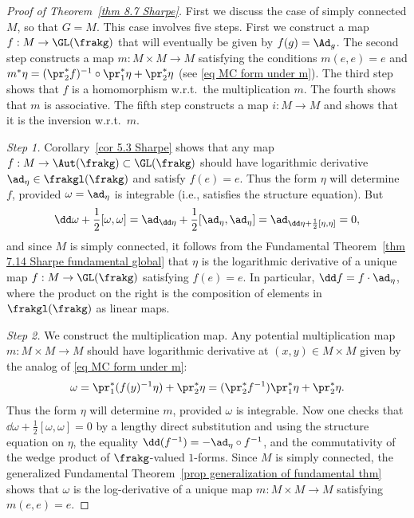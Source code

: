 \begin{proof}[Proof of Theorem~\ref{thm 8.7 Sharpe}]
    First we discuss the case of simply connected $M$, so that $G=M$. This case involves five steps. First we construct a map $f:M\to \GL(\frakg)$ that will eventually be given by $f(g)=\Ad_g$. The second step constructs a map $m:M\times M\to M$ satisfying the conditions $m(e,e)=e$ and $m^\ast \eta=(\pr_2^\ast f)^{-1} \circ \pr_1^\ast\eta+\pr_2^\ast\eta$ (see \eqref{eq MC form under m}). The third step shows that $f$ is a homomorphism w.r.t.\ the multiplication $m$. The fourth shows that $m$ is associative. The fifth step constructs a map $i:M\to M$ and shows that it is the inversion w.r.t.\ $m$.

    \emph{Step 1.} Corollary~\ref{cor 5.3 Sharpe} shows that any map $f:M\to \Aut(\frakg)\subset \GL(\frakg)$ should have logarithmic derivative $\ad_{\eta}\in \frakgl(\frakg)$ and satisfy $f(e)=e$. Thus the form $\eta$ will determine $f$, provided $\omega=\ad_\eta$ is integrable (i.e., satisfies the structure equation). But
    \[\dd\omega+\frac12[\omega,\omega]=\ad_{\dd\eta}+\frac12[\ad_\eta,\ad_\eta]=\ad_{\dd\eta+\frac12[\eta,\eta]}=0,\]
    and since $M$ is simply connected, it follows from the Fundamental Theorem~\ref{thm 7.14 Sharpe fundamental global} that $\eta$ is the logarithmic derivative of a unique map $f:M\to \GL(\frakg)$ satisfying $f(e)=e$. In particular, $\dd f=f\cdot \ad_\eta$, where the product on the right is the composition of elements in $\frakgl(\frakg)$ as linear maps.

    \emph{Step 2.} We construct the multiplication map. Any potential multiplication map $m:M\times M\to M$ should have logarithmic derivative at $(x,y)\in M\times M$ given by the analog of \eqref{eq MC form under m}:
    \[\omega=\pr_1^\ast (f(y)^{-1}\eta)+\pr_2^\ast\eta=(\pr_2^\ast f^{-1})\pr_1^\ast\eta+\pr_2^\ast\eta.\]
    Thus the form $\eta$ will determine $m$, provided $\omega$ is integrable. Now one checks that $\dd\omega+\frac12[\omega,\omega]=0$ by a lengthy direct substitution and using the structure equation on $\eta$, the equality $\dd (f^{-1})=-\ad_\eta\circ f^{-1}$, and the commutativity of the wedge product of $\frakg$-valued $1$-forms. Since $M$ is simply connected, the generalized Fundamental Theorem~\ref{prop generalization of fundamental thm} shows that $\omega$ is the log-derivative of a unique map $m:M\times M\to M$ satisfying $m(e,e)=e$.


\end{proof}
